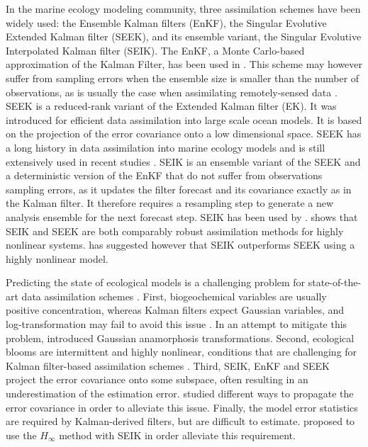 In the marine ecology modeling community, three assimilation schemes have been
widely used: the Ensemble Kalman filters (EnKF), the Singular Evolutive
Extended Kalman filter (SEEK), and its ensemble variant, the Singular Evolutive
Interpolated Kalman filter (SEIK). The EnKF, a Monte Carlo-based approximation
of the Kalman Filter, has been used in \citet{Ciavatta2011, Ciavatta2014}. This
scheme may however suffer from sampling errors when the ensemble size is
smaller than the number of observations, as is usually the case when
assimilating remotely-sensed data \citep{Nerger2005, Altaf2014}.  SEEK is a
reduced-rank variant of the Extended Kalman filter (EK). It was introduced for
efficient data assimilation into large scale ocean models.  It is based  on the
projection of the error covariance onto a low dimensional space.  SEEK has a
long history in data assimilation into marine ecology models and is still
extensively used in recent studies \citep{Fontana2013, Korres2012,
Butenschon2012}. SEIK is an ensemble variant of the SEEK  and a deterministic
version of the EnKF that do not suffer from observations sampling errors, as it
updates the filter forecast and its covariance exactly as in the Kalman filter.
It therefore requires a resampling step to generate a new analysis ensemble for
the next forecast step. SEIK has been used by \citet{Triantafyllou2013,
Korres2012}. \citet{Korres2012} shows that SEIK and SEEK are both comparably
robust assimilation methods for highly nonlinear systems. \citet{Hoteit2005}
has suggested however that SEIK outperforms SEEK using a highly nonlinear
model.

Predicting the state of ecological models is a challenging problem for
state-of-the-art data assimilation schemes \citep{Edwards2015}. First,
biogeochemical variables are usually positive concentration, whereas Kalman
filters expect Gaussian variables, and log-transformation may fail to avoid
this issue \citep{Ciavatta2011}. In an attempt to mitigate this problem,
\citet{Fontana2013} introduced Gaussian anamorphosis transformations.  Second,
ecological blooms are intermittent and highly nonlinear, conditions that are
challenging for Kalman filter-based assimilation schemes \citep{Hoteit2005}.
Third, SEIK, EnKF and SEEK project the error covariance onto some subspace,
often resulting in an underestimation of the estimation error. \citet{Butenschon2012}
studied different ways to propagate the error covariance in order to alleviate
this issue. Finally, the model error statistics are required by Kalman-derived
filters, but are difficult to estimate. \citet{Triantafyllou2013} proposed to
use the $H_\infty$ method with SEIK in order alleviate this requirement.

